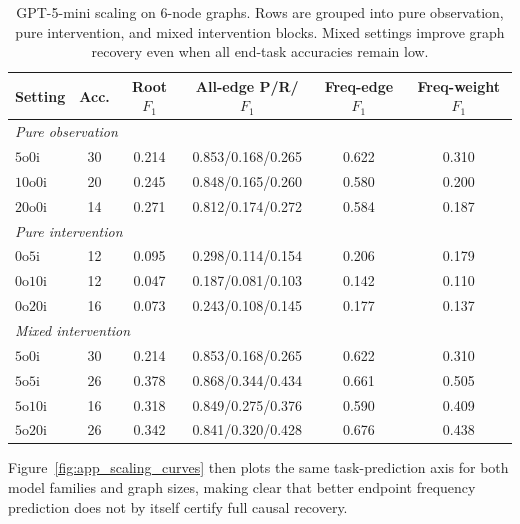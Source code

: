 \begin{table}[!ht]
\centering
\small
\setlength{\tabcolsep}{4pt}
\begin{tabular}{lccccc}
\toprule
Setting & Acc. & Root \(F_1\) & All-edge P/R/\(F_1\) & Freq-edge \(F_1\) & Freq-weight \(F_1\) \\
\midrule
\multicolumn{6}{l}{\textit{Pure observation}} \\
\(5\mathrm{o}0\mathrm{i}\) & 30 & 0.214 & 0.853/0.168/0.265 & 0.622 & 0.310 \\
\(10\mathrm{o}0\mathrm{i}\) & 20 & 0.245 & 0.848/0.165/0.260 & 0.580 & 0.200 \\
\(20\mathrm{o}0\mathrm{i}\) & 14 & 0.271 & 0.812/0.174/0.272 & 0.584 & 0.187 \\
\midrule
\multicolumn{6}{l}{\textit{Pure intervention}} \\
\(0\mathrm{o}5\mathrm{i}\) & 12 & 0.095 & 0.298/0.114/0.154 & 0.206 & 0.179 \\
\(0\mathrm{o}10\mathrm{i}\) & 12 & 0.047 & 0.187/0.081/0.103 & 0.142 & 0.110 \\
\(0\mathrm{o}20\mathrm{i}\) & 16 & 0.073 & 0.243/0.108/0.145 & 0.177 & 0.137 \\
\midrule
\multicolumn{6}{l}{\textit{Mixed intervention}} \\
\(5\mathrm{o}0\mathrm{i}\) & 30 & 0.214 & 0.853/0.168/0.265 & 0.622 & 0.310 \\
\(5\mathrm{o}5\mathrm{i}\) & 26 & 0.378 & 0.868/0.344/0.434 & 0.661 & 0.505 \\
\(5\mathrm{o}10\mathrm{i}\) & 16 & 0.318 & 0.849/0.275/0.376 & 0.590 & 0.409 \\
\(5\mathrm{o}20\mathrm{i}\) & 26 & 0.342 & 0.841/0.320/0.428 & 0.676 & 0.438 \\
\bottomrule
\end{tabular}
\caption{GPT-5-mini scaling on 6-node graphs. Rows are grouped into pure observation, pure intervention, and mixed intervention blocks. Mixed settings improve graph recovery even when all end-task accuracies remain low.}
\label{tab:scaling_mini_6nodes_metrics}
\end{table}

Figure~\ref{fig:app_scaling_curves} then plots the same task-prediction axis
for both model families and graph sizes, making clear that better endpoint
frequency prediction does not by itself certify full causal recovery.

